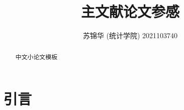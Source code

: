 \documentclass{ctexart}
\title{主文献论文参感}
\author{苏锦华  (统计学院) 2021103740}
\begin{document}
\maketitle

\begin{abstract}
      中文小论文模板
\end{abstract}

\section{引言}







\end{document}
